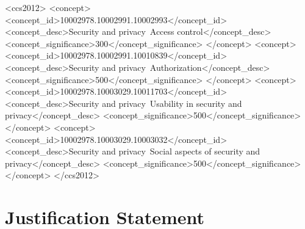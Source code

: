 \documentclass[sigconf, review, anonymous]{acmart}
\theoremstyle{mydef}
\begin{document}
\begin{abstract}

\end{abstract}


\begin{CCSXML}
<ccs2012>
   <concept>
       <concept_id>10002978.10002991.10002993</concept_id>
       <concept_desc>Security and privacy~Access control</concept_desc>
       <concept_significance>300</concept_significance>
       </concept>
   <concept>
       <concept_id>10002978.10002991.10010839</concept_id>
       <concept_desc>Security and privacy~Authorization</concept_desc>
       <concept_significance>500</concept_significance>
       </concept>
   <concept>
       <concept_id>10002978.10003029.10011703</concept_id>
       <concept_desc>Security and privacy~Usability in security and privacy</concept_desc>
       <concept_significance>500</concept_significance>
       </concept>
   <concept>
       <concept_id>10002978.10003029.10003032</concept_id>
       <concept_desc>Security and privacy~Social aspects of security and privacy</concept_desc>
       <concept_significance>500</concept_significance>
       </concept>
 </ccs2012>
\end{CCSXML}



\maketitle

\section*{Justification Statement}
\label{sec:justification}

\end{document}
